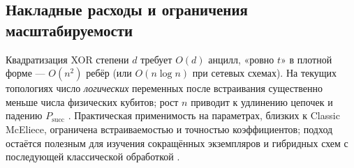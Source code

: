 \subsection{Накладные расходы и ограничения масштабируемости}
Квадратизация XOR степени $d$ требует $O(d)$ анцилл, «ровно $t$» в плотной форме — $O(n^2)$ ребёр (или $O(n\log n)$ при сетевых схемах). На текущих топологиях число \emph{логических} переменных после встраивания существенно меньше числа физических кубитов; рост $n$ приводит к удлинению цепочек и падению $P_{\mathrm{succ}}$ \cite{Bian2018,Sirdey2023,Pei2025}. Практическая применимость на параметрах, близких к Classic McEliece, ограничена встраиваемостью и точностью коэффициентов; подход остаётся полезным для изучения сокращённых экземпляров и гибридных схем с последующей классической обработкой \cite{ClassicMcEliece2020,Im2025}.
